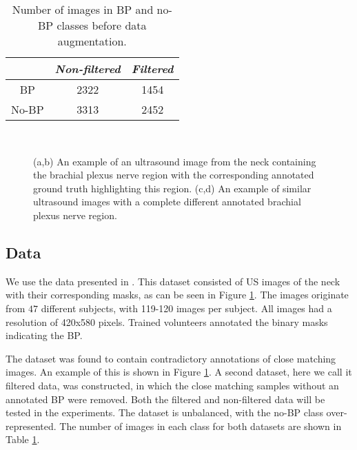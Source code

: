 \renewcommand{\arraystretch}{1.20}
\begin{table}[tb]
\caption{Number of images in BP and no-BP classes before data augmentation.}
\label{table:Nr_images}
\centering
\begin{tabular}{c|c c}
\hline
\textit{} & \textit{Non-filtered} & \textit{Filtered}\\ \hline
BP & 2322 & 1454 \\ 
No-BP & 3313 & 2452 \\ \hline
\end{tabular}
\end{table}

\begin{figure}[tb] 
    \centering
     \hspace{0.05\linewidth}
     \\
    \hspace{0.05\linewidth}
    \caption{(a,b) An example of an ultrasound image from the neck containing the brachial plexus nerve region with the corresponding annotated ground truth highlighting this region. (c,d) An example of similar ultrasound images with a complete different annotated brachial plexus nerve region.}
    \label{fig:example_images} 
\end{figure}


\subsection{Data}\label{section:data}
We use the data presented in \cite{KaggleDataset}. This dataset consisted of US images of the neck with their corresponding masks, as can be seen in Figure \ref{fig:example_images}. The images originate from $47$ different subjects, with 119-120 images per subject. All images had a resolution of 420x580 pixels. Trained volunteers annotated the binary masks indicating the BP. 

The dataset was found to contain contradictory annotations of close matching images. An example of this is shown in Figure \ref{fig:example_images}. A second dataset, here we call it filtered data, was constructed, in which the close matching samples without an annotated BP were removed.
Both the filtered and non-filtered data will be tested in the experiments. The dataset is unbalanced, with the no-BP class over-represented. The number of images in each class for both datasets are shown in Table \ref{table:Nr_images}. 

